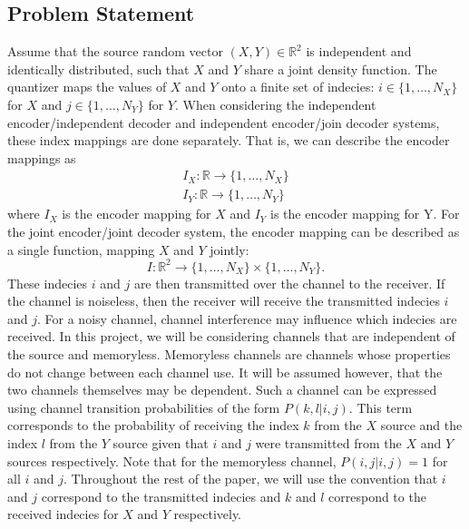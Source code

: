 \documentclass[10pt]{article}
\newcommand{\real}{\mathbb{R}}
\begin{document}
\subsection{Problem Statement}
\label{sec:prob_state}
Assume that the source random vector $(X,Y)\in\real^2$ is independent and identically distributed, such that $X$ and $Y$ share a joint density function. The quantizer maps the values of $X$ and $Y$ onto a finite set of indecies: $i\in\{1,\ldots,N_X\}$ for $X$ and $j\in\{1,\ldots,N_Y\}$ for $Y$. When considering the independent encoder/independent decoder and independent encoder/join decoder systems, these index mappings are done separately. That is, we can describe the encoder mappings as
\begin{gather*}
    I_X : \real\to\{1,\ldots,N_X\} \\
    I_Y : \real\to\{1,\ldots,N_Y\}
\end{gather*}
where $I_X$ is the encoder mapping for $X$ and $I_Y$ is the encoder mapping for Y. For the joint encoder/joint decoder system, the encoder mapping can be described as a single function, mapping $X$ and $Y$ jointly:
\begin{equation*}
    I : \real^2\to\{1,\ldots,N_X\} \times \{1,\ldots,N_Y\}.
\end{equation*}
These indecies $i$ and $j$ are then transmitted over the channel to the receiver. If the channel is noiseless, then the receiver will receive the transmitted indecies $i$ and $j$. For a noisy channel, channel interference may influence which indecies are received. In this project, we will be considering channels that are independent of the source and memoryless. Memoryless channels are channels whose properties do not change between each channel use. It will be assumed however, that the two channels themselves may be dependent. Such a channel can be expressed using channel transition probabilities of the form $P(k,l|i,j)$. This term corresponds to the probability of receiving the index $k$ from the $X$ source and the index $l$ from the $Y$ source given that $i$ and $j$ were transmitted from the $X$ and $Y$ sources respectively. Note that for the memoryless channel, $P(i,j|i,j)=1$ for all $i$ and $j$. Throughout the rest of the paper, we will use the convention that $i$ and $j$ correspond to the transmitted indecies and $k$ and $l$ correspond to the received indecies for $X$ and $Y$ respectively.
\end{document}
